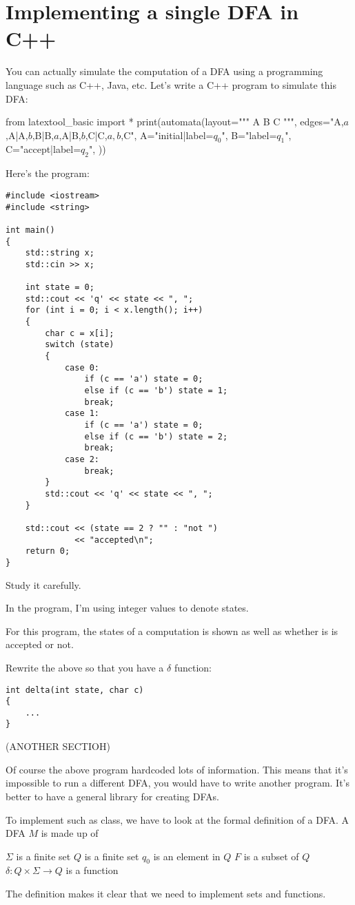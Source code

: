 \section{Implementing a single DFA in C++}

You can actually simulate the computation
of a DFA using a programming language such as C++, Java, etc.
Let's write a C++ program to simulate this DFA:

\begin{python}
from latextool_basic import *
print(automata(layout="""
A  B  C
""",
edges="A,$a$,A|A,$b$,B|B,$a$,A|B,$b$,C|C,$a,b$,C",
A="initial|label=$q_0$",
B="label=$q_1$",
C="accept|label=$q_2$",
))
\end{python}

Here's the program:
\begin{Verbatim}[frame=single, fontsize=\small]
#include <iostream>
#include <string>

int main()
{
    std::string x;
    std::cin >> x;

    int state = 0;
    std::cout << 'q' << state << ", ";
    for (int i = 0; i < x.length(); i++)
    {
        char c = x[i];
        switch (state)
        {
            case 0:
                if (c == 'a') state = 0;
                else if (c == 'b') state = 1;
                break;
            case 1:
                if (c == 'a') state = 0;
                else if (c == 'b') state = 2;
                break;
            case 2:
                break;
        } 
        std::cout << 'q' << state << ", ";
    }
   
    std::cout << (state == 2 ? "" : "not ")
              << "accepted\n";
    return 0;
}
\end{Verbatim}
Study it carefully.

In the program, I'm using integer values to denote states.

For this program, the states of a computation is shown as well as whether is
is accepted or not.

\begin{ex}
Rewrite the above so that you have a $\delta$ function:
\begin{Verbatim}[frame=single, fontsize=\small]
int delta(int state, char c)
{
    ...
}
\end{Verbatim}
\end{ex}

(ANOTHER SECTIOH)

Of course the above program hardcoded lots of information.
This means that it's impossible to run a different DFA, you would have to
write another program.
It's better to have a general library for creating DFAs.

To implement such as class, we have to look at the
formal definition of a DFA.
A DFA $M$ is made up of
\begin{enumerate}[label=\textnormal{(\alph*)},itemsep=0pt,nosep,noitemsep,partopsep=0pt,topsep=0pt,parsep=0pt]
  \li $\Sigma$ is a finite set
  \li $Q$ is a finite set
  \li $q_0$ is an element in $Q$
  \li $F$ is a subset of $Q$
  \li $\delta: Q \times \Sigma \rightarrow Q$ is a function 
\end{enumerate}
The definition makes it clear that we need to implement
sets and functions.

